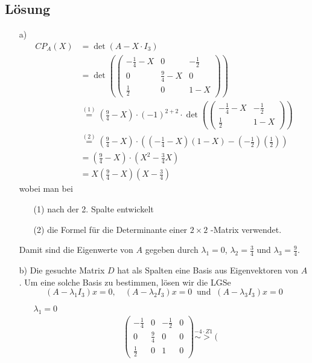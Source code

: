 \subsection*{L\"osung}
\begin{itemize}
\item[a)] 
\begin{align*}
CP_A(X)&=\det(A-X\cdot I_3)\\
&=\det(\begin{pmatrix} -\frac{1}{4}-X & 0 & -\frac{1}{2} \\ 0 & \frac{9}{4}-X & 0 \\ \frac{1}{2} & 0 &1-X \end{pmatrix})\\
&\stackrel{(1)}{=}(\frac{9}{4}-X )\cdot(-1)^{2+2}\cdot \det(\begin{pmatrix} -\frac{1}{4}-X & -\frac{1}{2} \\ \frac{1}{2} & 1-X \end{pmatrix})\\
&\stackrel{(2)}{=}(\frac{9}{4}-X )\cdot((-\frac{1}{4}-X)(1-X )-(-\frac{1}{2})(\frac{1}{2}))\\
&=(\frac{9}{4}-X )\cdot(X^2-\frac{3}{4}X)\\
&=X(\frac{9}{4}-X )(X-\frac{3}{4})
\end{align*}
wobei man bei
\begin{itemize}
\item[(1)] nach der 2. Spalte entwickelt
\item[(2)] die Formel für die Determinante einer $2\times2$ -Matrix verwendet.
\end{itemize}
Damit sind die Eigenwerte von $A$ gegeben durch $\lambda_1=0$, $\lambda_2=\frac{3}{4}$ und $\lambda_3=\frac{9}{4}$.
\item[b)] Die gesuchte Matrix $D$ hat als Spalten eine Basis aus Eigenvektoren von $A$. Um eine solche Basis zu bestimmen, lösen wir die LGSe
$$
(A-\lambda_1I_3)x=0, \quad (A-\lambda_2I_3)x=0 \ \text{ und } \  (A-\lambda_3I_3)x=0
$$
\begin{itemize}
\item[$\lambda_1=0$]
\begin{align*}
&\left(\begin{array}{ccc|c}
-\frac{1}{4} & 0 & -\frac{1}{2} &0\\ 0 & \frac{9}{4} & 0 &0\\ \frac{1}{2} & 0 &1 &0
\end{array}\right)\stackrel{-4\cdot Z1}{\sim >}
\left(\begin{array}{ccc|c}

\end{array}
\end{align*}
\end{itemize}
\end{itemize}

